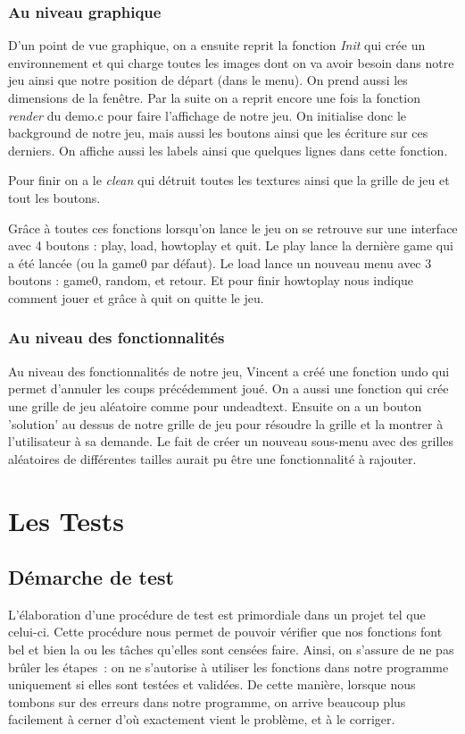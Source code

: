 \documentclass[12]{article}
\begin{document}
\subsubsection{Au niveau graphique}

D'un point de vue graphique, on a ensuite reprit la fonction \textit{Init} qui crée un environnement et qui charge toutes les images dont on va avoir besoin dans notre jeu ainsi que notre position de départ (dans le menu). On prend aussi les dimensions de la fenêtre.
Par la suite on a reprit encore une fois la fonction \textit{render} du demo.c pour faire l'affichage de notre jeu. On initialise donc le background de notre jeu, mais aussi les boutons ainsi que les écriture sur ces derniers. On affiche aussi les labels ainsi que quelques lignes dans cette fonction.

Pour finir on a le \textit{clean} qui détruit toutes les textures ainsi que la grille de jeu et tout les boutons.

Grâce à toutes ces fonctions lorsqu'on lance le jeu on se retrouve sur une interface avec 4 boutons : play, load, howtoplay et quit. Le play lance la dernière game qui a été lancée (ou la game0 par défaut). Le load lance un nouveau menu avec 3 boutons : game0, random, et retour. Et pour finir howtoplay nous indique comment jouer et grâce à quit on quitte le jeu.

\subsubsection{Au niveau des fonctionnalités}
Au niveau des fonctionnalités de notre jeu, Vincent a créé une fonction undo qui permet d'annuler les coups précédemment joué. On a aussi une fonction qui crée une grille de jeu aléatoire comme pour undeadtext. Ensuite on a un bouton 'solution' au dessus de notre grille de jeu pour résoudre la grille et la montrer à l'utilisateur à sa demande.
Le fait de créer un nouveau sous-menu avec des grilles aléatoires de différentes tailles aurait pu être une fonctionnalité à rajouter. 


\section{Les Tests}
\subsection{Démarche de test}
L’élaboration d’une procédure de test est primordiale dans un projet tel que celui-ci. Cette procédure nous permet de pouvoir vérifier que nos fonctions font bel et bien la ou les tâches qu’elles sont censées faire. Ainsi, on s’assure de ne pas brûler les étapes : on ne s’autorise à utiliser les fonctions dans notre programme uniquement si elles sont testées et validées. De cette manière, lorsque nous tombons sur des erreurs dans notre programme, on arrive beaucoup plus facilement à cerner d’où exactement vient le problème, et à le corriger.\\ 
\end{document}
